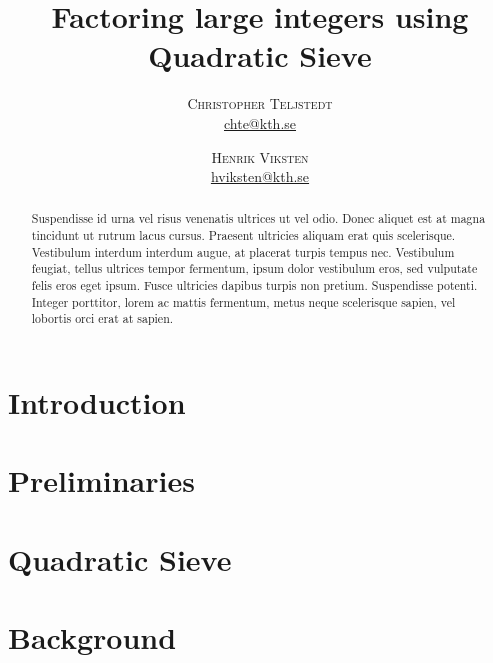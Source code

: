 \documentclass[twoside,11pt,english]{article}
\title{\vspace{-15mm}%
	\fontsize{24pt}{10pt}\selectfont
	\textbf{Factoring large integers using Quadratic Sieve}
	}
\author{%
	\large
	\textsc{Christopher Teljstedt} \\[2mm]
	\normalsize	\href{mailto:chte@kth.se}{chte@kth.se} 
	\and
	\textsc{Henrik Viksten} \\[2mm]
	\normalsize	\href{mailto:hviksten@kth.se}{hviksten@kth.se}
	}
\begin{document}
\maketitle
\thispagestyle{fancy}


\begin{abstract}
\noindent Suspendisse id urna vel risus venenatis ultrices ut vel odio. Donec aliquet est at magna tincidunt ut rutrum lacus cursus. Praesent ultricies aliquam erat quis scelerisque. Vestibulum interdum interdum augue, at placerat turpis tempus nec. Vestibulum feugiat, tellus ultrices tempor fermentum, ipsum dolor vestibulum eros, sed vulputate felis eros eget ipsum. Fusce ultricies dapibus turpis non pretium. Suspendisse potenti. Integer porttitor, lorem ac mattis fermentum, metus neque scelerisque sapien, vel lobortis orci erat at sapien. 
\end{abstract}
	

\begin{multicols}{2}
\section{Introduction}

\newpage
\section{Preliminaries}

\newpage
\section{Quadratic Sieve}

\newpage
\section{Background}


\newpage


\end{multicols}
\end{document}
